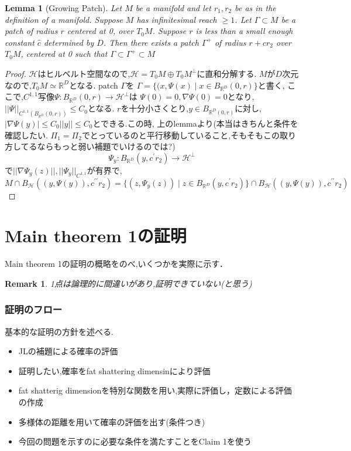 \documentclass{ujarticle}
\newtheorem{lem}[thm]{Lemma}
\newtheorem*{rem}{Remark}
\begin{document}
\begin{lem}[Growing Patch]
  Let $M$ be a manifold and let $r_1,r_2$ be as in the definition of a manifold.
Suppose $M$ has infinitesimal reach $ \ge 1$. Let $\Gamma \subset M$ be a patch of radius $r$ centered at 0, over $T_0M$. Suppose
$r$ is less than a small enough constant $\hat{c}$ determined by $D$. Then there exists a patch $\Gamma^{+}$ of radius $r + cr_2$
over $T_0M$, centered at 0 such that $\Gamma \subset \Gamma^{+} \subset M$
\end{lem}
\begin{proof}
 $\mathcal{H}$はヒルベルト空間なので,$\mathcal{H}=T_0M \oplus T_0M^{\perp}$に直和分解する.
 $M$が$D$次元なので,$T_0M \simeq \mathbb{R}^D$となる.
 patch $\Gamma$を
 $\Gamma =\{(x,\Psi(x) \mid x \in B_{\mathbb{R}^D}(0,r) \}$と書く,
ここで,$C^{1,1}$写像$\Psi: B_{\mathbb{R}^D}(0,r) \to \mathcal{H}^{\perp}$は
$\Psi(0)=0,\nabla\Psi(0)=0$となり,$||\Psi||_{C^{1,1}(B_{\mathbb{R}^D}(0,r))} \le C_0$となる.
$r$を十分小さくとり,$y \in B_{\mathbb{R}^D(0,r)}$に対し,
$|\nabla \Psi(y)| \le C_0||y|| \le C_0$とできる.この時,
上のlemmaより(本当はきちんと条件を確認したい.
$\Pi_1=\Pi_2$でとっているのと平行移動していること,そもそもこの取り方してるならもっと弱い補題でいけるのでは?)
\begin{equation*}
 \Psi_y:B_{\mathbb{R}^D}(y,c^{\prime} r_2) \to \mathcal{H}^{\perp}
\end{equation*}
で$||\nabla\Psi_y(z)||,||\Psi_y||_{C^{1,1}}$が有界で,
\begin{equation*}
 M \cap B_{\mathcal{H}}((y,\Psi(y)),c^{\prime\prime} r_2) =
 \{ (z,\Psi_y(z)) \mid z \in B_{\mathbb{R}^D}(y,c^{\prime} r_2)\}
 \cap B_{\mathcal{H}}((y,\Psi(y)),c^{\prime\prime} r_2)
\end{equation*}
\end{proof}

\part{Main theorem 1の証明}
Main theorem 1の証明の概略をのべ,いくつかを実際に示す．
\begin{rem}
1点は論理的に間違いがあり,証明できていない(と思う)
\end{rem}

\section{証明のフロー}
\label{sec:証明のフロー}
基本的な証明の方針を述べる.

\begin{itemize}
  \item JLの補題による確率の評価
  \item 証明したい,確率をfat shattering dimensinにより評価
  \item fat shatterig dimensionを特別な関数を用い,実際に評価し，定数による評価の作成
  \item 多様体の距離を用いて確率の評価を出す(条件つき)
  \item 今回の問題を示すのに必要な条件を満たすことをClaim 1を使う
\end{itemize}
\end{document}
